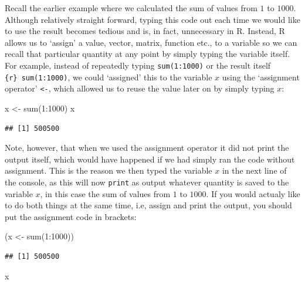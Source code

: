 \documentclass[
]{book}
\newenvironment{Shaded}{\begin{snugshade}}{\end{snugshade}}
\newcommand{\DecValTok}[1]{\textcolor[rgb]{0.00,0.00,0.81}{#1}}
\newcommand{\FunctionTok}[1]{\textcolor[rgb]{0.00,0.00,0.00}{#1}}
\newcommand{\NormalTok}[1]{#1}
\newcommand{\OtherTok}[1]{\textcolor[rgb]{0.56,0.35,0.01}{#1}}
\newcommand{\SpecialCharTok}[1]{\textcolor[rgb]{0.00,0.00,0.00}{#1}}
\theoremstyle{definition}
\theoremstyle{definition}
\theoremstyle{definition}
\theoremstyle{definition}
\theoremstyle{remark}
\begin{document}
Recall the earlier example where we calculated the sum of values from \(1\) to \(1000\). Although relatively straight forward, typing this code out each time we would like to use the result becomes tedious and is, in fact, unnecessary in R. Instead, R allows us to `assign' a value, vector, matrix, function etc., to a variable so we can recall that particular quantity at any point by simply typing the variable itself. For example, instead of repeatedly typing \texttt{sum(1:1000)} or the result itself \texttt{\{r\}\ sum(1:1000)}, we could `assigned' this to the variable \(x\) using the `assignment operator' \texttt{\textless{}-}, which allowed us to reuse the value later on by simply typing \(x\):

\begin{Shaded}
\begin{Highlighting}[]
\NormalTok{x }\OtherTok{\textless{}{-}} \FunctionTok{sum}\NormalTok{(}\DecValTok{1}\SpecialCharTok{:}\DecValTok{1000}\NormalTok{)}
\NormalTok{x}
\end{Highlighting}
\end{Shaded}

\begin{verbatim}
## [1] 500500
\end{verbatim}

Note, however, that when we used the assignment operator it did not print the output itself, which would have happened if we had simply ran the code without assignment. This is the reason we then typed the variable \(x\) in the next line of the console, as this will now \texttt{print} as output whatever quantity is saved to the variable \(x\), in this case the sum of values from \(1\) to \(1000\). If you would actualy like to do both things at the same time, i.e, assign and print the output, you should put the assignment code in brackets:

\begin{Shaded}
\begin{Highlighting}[]
\NormalTok{(x }\OtherTok{\textless{}{-}} \FunctionTok{sum}\NormalTok{(}\DecValTok{1}\SpecialCharTok{:}\DecValTok{1000}\NormalTok{))}
\end{Highlighting}
\end{Shaded}

\begin{verbatim}
## [1] 500500
\end{verbatim}

\begin{Shaded}
\begin{Highlighting}[]
\NormalTok{x}
\end{Highlighting}
\end{Shaded}
\end{document}
